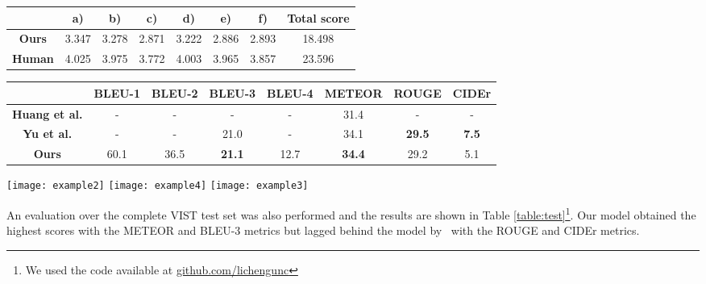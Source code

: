 \documentclass[11pt,a4paper]{article}
\begin{document}
\begin{table*}[t]
    \begin{center}
      \begin{tabular}{| c | c | c | c | c | c | c | c |}
        \hline
         & \bf a) & \bf b) & \bf c) & \bf d) & \bf e) & \bf f) & \bf Total score \\ \hline
         \bf Ours & 3.347 & 3.278 & 2.871 & 3.222 & 2.886 & 2.893 & 18.498 \\ \hline
         \bf Human & 4.025 & 3.975 & 3.772 & 4.003 & 3.965 & 3.857 & 23.596 \\ \hline
      \end{tabular}
      \caption{Human evaluation of stories generated by our visual storyteller, compared to stories generated by humans.}
      \label{table:human}
    \end{center}
\end{table*}

\begin{table*}[t]
    \begin{center}
      \begin{tabular}{| c | c | c | c | c | c | c | c |}
        \hline
         & \bf BLEU-1 & \bf BLEU-2 & \bf BLEU-3 & \bf BLEU-4 & \bf METEOR & \bf ROUGE & \bf CIDEr  \\ \hline
         \bf Huang et al. & - & - & - & - & 31.4 & - & -\\ \hline
         \bf Yu et al. & - & - & 21.0 & - & 34.1 & \bf 29.5 & \bf 7.5\\ \hline
         \bf Ours & 60.1 & 36.5 & \bf 21.1 & 12.7 & \bf 34.4 & 29.2 & 5.1\\ \hline
      \end{tabular}
      \caption{Automatic evaluation on the VIST dataset. A comparison between the baseline~\cite{huang2016},  \cite{licheng} and ours.}
      \label{table:test}
    \end{center}
\end{table*}

\begin{figure*}[hb!]
    \centering
    \texttt{[image: example2]}
    \texttt{[image: example4]}
    \texttt{[image: example3]}
    \caption{Sample stories generated by our visual storyteller, compared to generated by humans.}
    \label{fig:mesh2}
\end{figure*}
An evaluation over the complete VIST test set was also performed and the results are shown in Table \ref{table:test}\footnote{\footnotesize We used the code available at \href{https://github.com/lichengunc/vist_eval}{github.com/lichengunc}}. 
\newpage
Our model obtained the highest scores with the METEOR and BLEU-3 metrics but lagged behind the model by~\cite{licheng} with the ROUGE and CIDEr metrics. 
\end{document}
